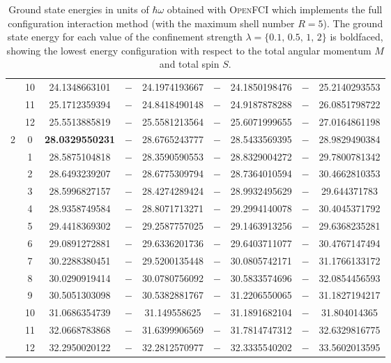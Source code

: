 \begin{table}[ht]
{\begin{tabular}{c|c|c|c|c|c|c|c|c}
& 10 & 24.1348663101& $-$& 24.1974193667& $-$& 24.1850198476& $-$& 25.2140293553\\ 
& 11 & 25.1712359394& $-$& 24.8418490148& $-$& 24.9187878288& $-$& 26.0851798722\\ 
& 12 & 25.5513885819& $-$& 25.5581213564& $-$& 25.6071999655& $-$& 27.0164861198\\ 
\hline                    %
\multirow{13}{*}{2} & 0 & \textbf{28.0329550231}& $-$& 28.6765243777& $-$& 28.5433569395& $-$& 28.9829490384\\ 
& 1 & 28.5875104818& $-$& 28.3590590553& $-$& 28.8329004272& $-$& 29.7800781342\\ 
& 2 & 28.6493239207& $-$& 28.6775309794& $-$& 28.7364010594& $-$& 30.4662810353\\ 
& 3 & 28.5996827157& $-$& 28.4274289424& $-$& 28.9932495629& $-$& 29.644371783\\ 
& 4 & 28.9358749584& $-$& 28.8071713271& $-$& 29.2994140078& $-$& 30.4045371792\\ 
& 5 & 29.4418369302& $-$& 29.2587757025& $-$& 29.1463913256& $-$& 29.6368235281\\ 
& 6 & 29.0891272881& $-$& 29.6336201736& $-$& 29.6403711077& $-$& 30.4767147494\\ 
& 7 & 30.2288380451& $-$& 29.5200135448& $-$& 30.0805742171& $-$& 31.1766133172\\ 
& 8 & 30.0290919414& $-$& 30.0780756092& $-$& 30.5833574696& $-$& 32.0854456593\\ 
& 9 & 30.5051303098& $-$& 30.5382881767& $-$& 31.2206550065& $-$& 31.1827194217\\ 
& 10 & 31.0686354739& $-$& 31.149558625& $-$& 31.1891682104& $-$& 31.804014365\\ 
& 11 & 32.0668783868& $-$& 31.6399906569& $-$& 31.7814747312& $-$& 32.6329816775\\ 
& 12 & 32.2950020122& $-$& 32.2812570977& $-$& 32.3335540202& $-$& 33.5602013595\\
\toprule[1pt]
\end{tabular}
}
 \caption{Ground state energies in units of $\hbar \omega$ obtained with \textsc{OpenFCI} which implements the full configuration interaction method (with the maximum shell number $R=5$). The ground state energy for each value of the confinement strength $\lambda=\{0.1,\,0.5,\,1,\,2\}$ is boldfaced, showing the lowest energy configuration with respect to the total angular momentum $M$ and total spin $S$.}
\label{table:GSfci} 
\end{table} 
\clearpage


